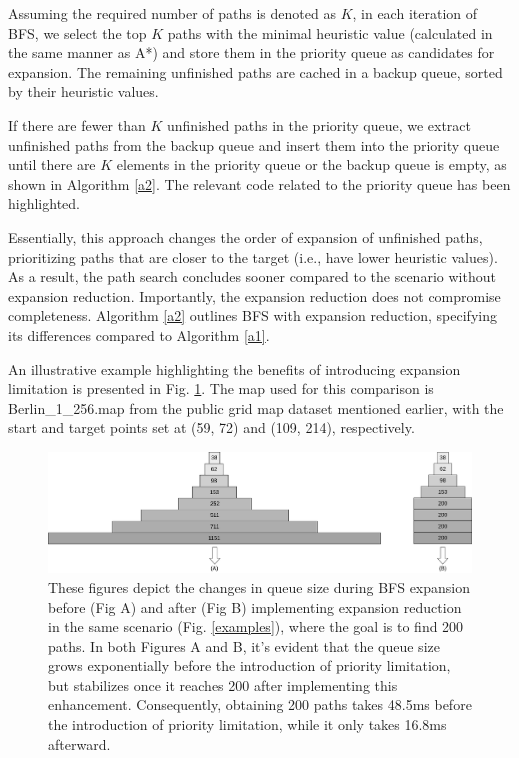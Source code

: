 \documentclass[lettersize,journal]{IEEEtran}
\begin{document}
Assuming the required number of paths is denoted as $K$, in each iteration of BFS, we select the top $K$ paths with the minimal heuristic value (calculated in the same manner as A*) and store them in the priority queue as candidates for expansion. The remaining unfinished paths are cached in a backup queue, sorted by their heuristic values.

If there are fewer than $K$ unfinished paths in the priority queue, we extract unfinished paths from the backup queue and insert them into the priority queue until there are $K$ elements in the priority queue or the backup queue is empty, as shown in Algorithm \ref{a2}. The relevant code related to the priority queue has been highlighted.

Essentially, this approach changes the order of expansion of unfinished paths, prioritizing paths that are closer to the target (i.e., have lower heuristic values). As a result, the path search concludes sooner compared to the scenario without expansion reduction. Importantly, the expansion reduction does not compromise completeness. Algorithm \ref{a2} outlines BFS with expansion reduction, specifying its differences compared to Algorithm \ref{a1}.

An illustrative example highlighting the benefits of introducing expansion limitation is presented in Fig. \ref{priority}. The map used for this comparison is Berlin\_1\_256.map from the public grid map dataset mentioned earlier, with the start and target points set at (59, 72) and (109, 214), respectively.


\begin{figure}[t]
\centering
\vspace*{8pt}
\includegraphics[width=12.5cm]{priority.png}
\caption{These figures depict the changes in queue size during BFS expansion before (Fig A) and after (Fig B) implementing expansion reduction in the same scenario (Fig. \ref{examples}), where the goal is to find 200 paths. In both Figures A and B, it's evident that the queue size grows exponentially before the introduction of priority limitation, but stabilizes once it reaches 200 after implementing this enhancement. Consequently, obtaining 200 paths takes 48.5ms before the introduction of priority limitation, while it only takes 16.8ms afterward.
} 
\label{priority}
\end{figure}
\end{document}
